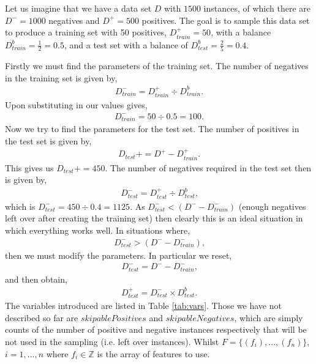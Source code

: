 \documentclass[twoside,a4paper]{refart}
\begin{document}
Let us imagine that we have a data set $D$ with $1500$ instances, of which there are $D^{-}=1000$ negatives and $D^{+}=500$ positives. The goal is to sample this data set to produce a training set with 50 positives, $D_{train}^{+}=50$, with a balance $D_{train}^{b}=\frac{1}{2}=0.5$, and a test set with a balance of $D_{test}^{b}=\frac{2}{5}=0.4$. 

Firstly we must find the parameters of the training set. The number of negatives in the training set is given by,
\begin{eqnarray*}
D_{train}^{-}=D_{train}^{+} \div D_{train}^{b}\textrm{.}
\end{eqnarray*}
Upon substituting in our values gives,
\begin{eqnarray*}
D_{train}^{-}=50\div 0.5=100\textrm{.}
\end{eqnarray*}
Now we try to find the parameters for the test set. The number of positives in the test set is given by,
\begin{eqnarray*}
D_{test}{+}=D^{+}-D_{train}^{+}\textrm{.}
\end{eqnarray*}
This gives us $D_{test}{+}=450$. The number of negatives required in the test set then is given by,
\begin{eqnarray*}
D_{test}^{-}=D_{test}^{+}\div D_{test}^{b}\textrm{,}
\end{eqnarray*}
which is $D_{test}^{-}=450 \div 0.4 = 1125$. As $D_{test}^{-} < (D^{-}-D_{train}^{-})$ (enough negatives left over after creating the training set) then clearly this is an ideal situation in which everything works well. In situations where,
\begin{eqnarray*}
D_{test}^{-} > (D^{-}-D_{train}^{-})\textrm{,}
\end{eqnarray*}
then we must modify the parameters. In particular we reset,
\begin{eqnarray*}
D_{test}^{-}=D^{-}-D_{train}^{-}\textrm{,}
\end{eqnarray*}
and then obtain,
\begin{eqnarray*} 
D_{test}^{+}=D_{test}^{-}\times D_{test}^{b}\textrm{.}
\end{eqnarray*} 
The variables introduced are listed in Table \ref{tab:vars}. Those we have not described so far are $skipablePositives$ and $skipableNegatives$, which are simply counts of the number of positive and negative instances respectively that will be not used in the sampling (i.e. left over instances). Whilst $F={ \lbrace (f_{i}),...,(f_{n})\rbrace}$, $i=1,...,n$ where $f_{i} \in \mathbb{Z} $ is the array of features to use.
\end{document}
